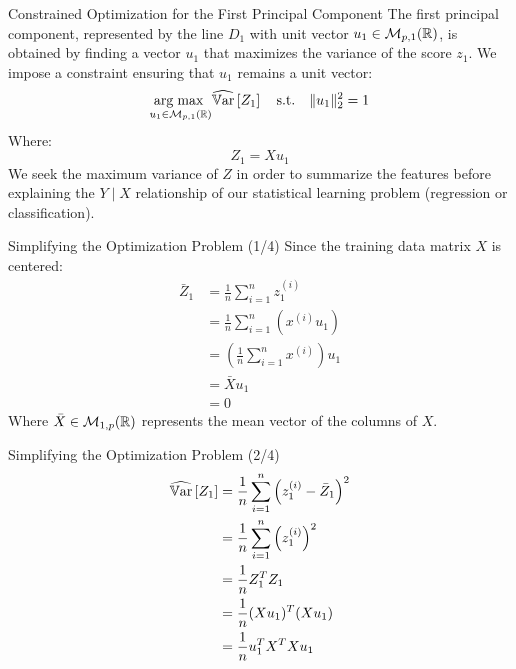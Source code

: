 \begin{frame}{Constrained Optimization for the First Principal Component}
	The first principal component, represented by the line $D_1$ with unit vector $u_1 \in \mathcal{M}_{p,1}(\mathbb{R})$, is obtained by finding a vector $u_1$ that maximizes the variance of the score $z_1$. We impose a constraint ensuring that $u_1$ remains a unit vector:
	\begin{equation}
		\underset{u_1 \in \mathcal{M}_{p,1}(\mathbb{R})}{\operatorname{arg\;max}\;} \widehat{\operatorname{\mathbb{V}ar}}\left[Z_1\right] \quad \text{s.t.} \quad \|u_1\|_2^2 = 1
		\nonumber
	\end{equation}
	Where:
	\begin{equation}
		Z_1 = X u_1
		\nonumber
	\end{equation}
	We seek the maximum variance of $Z$ in order to summarize the features before explaining the $Y \mid X$ relationship of our statistical learning problem (regression or classification).
\end{frame}

\begin{frame}{Simplifying the Optimization Problem (1/4)}
	Since the training data matrix $X$ is centered:
	\begin{equation}
		\begin{aligned}
			\bar{Z}_1 
			&= \frac{1}{n} \sum_{i=1}^n z_1^{(i)} \\
			&= \frac{1}{n} \sum_{i=1}^n \left(x^{(i)} u_1\right) \\
			&= \left(\frac{1}{n} \sum_{i=1}^n x^{(i)}\right) u_1 \\
			&= \bar{X} u_1 \\
			&= 0
		\end{aligned}
		\nonumber
	\end{equation}
	Where $\bar{X} \in \mathcal{M}_{1,p}(\mathbb{R})$ represents the mean vector of the columns of $X$. 
\end{frame}

\begin{frame}{Simplifying the Optimization Problem (2/4)}
	\begin{equation}
		\begin{aligned}
			\widehat{\operatorname{\mathbb{V}ar}}\left[Z_1\right] 
			&= \frac{1}{n} \sum_{i=1}^n \left(z_1^{(i)} - \bar{Z}_1\right)^2 \\
			&= \frac{1}{n} \sum_{i=1}^n \left(z_1^{(i)}\right)^2 \\
			&= \frac{1}{n} Z_1^T Z_1 \\
			&= \frac{1}{n} (X u_1)^T (X u_1) \\
			&= \frac{1}{n} u_1^T X^T X u_1
		\end{aligned}
		\nonumber
	\end{equation}
\end{frame}

